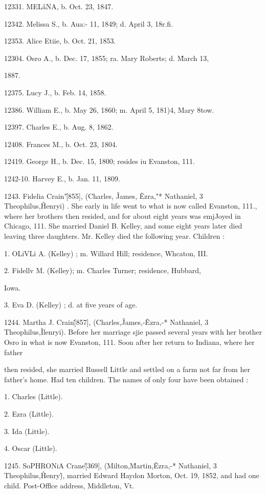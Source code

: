 12331. MEL\^aNA, b. Oct. 23, 1847. 

12342. Melissa S., b. Aua:- 11, 1849; d. April 3, 18r.fi. 

12353. Alice Etiie, b. Oct. 21, 1853. 

12304. Osro A., b. Dec. 17, 1855; ra. Mary Roberts; d. \^March 13, 

1887. 

12375. Lucy J., b. Feb. 14, 1858. 

12386. William E., b. May 26, 1860; m. April 5, 181)4, Mary 8tow. 

12397. Charles E., b. Aug. 8, 1862. 

12408. Frances M., b. Oct. 23, 1804. 

12419. George H., b. Dec. 15, 1800; resides iu Evanston, 111. 

1242-10. Harvey E., b. Jan. 11, 1809. 

1243. Fidelia Crain'\^ [855], (Charles, \^ James, \^ Ezra,"* 
Nathaniel, 3 Theophilus,\^ Henryi) . She early in life went to what 
is now called Evanston, 111., where her brothers then resided, and 
for about eight years was emjJoyed in Chicago, 111. She married 
Daniel B. Kelley, and some eight years later died leaving three 
daughters. Mr. Kelley died the following year. Children : 

1. OLiVLi A. (Kelley) ; m. Willard Hill; residence, Whcaton, III. 

2. Fidellv M. (Kelley); m. Charles Turner; residence, Hubbard, 

Iowa. 

3. Eva D. (Kelley) ; d. at five years of age. 

1244. Martha J. Crain\^ [857], (Charles,\^ James,-\^ Ezra,-* 
Nathaniel, 3 Theophilus,\^ Ilenryi). Before her marriage sjie 
passed several years with her brother Osro in what is now 
Evanston, 111. Soon after her return to Indiana, where her father 




then resided, she married Russell Little and settled on a farm not 
far from her father's home. Had ten children. The names of 
only four have been obtained : 

1. Charles (Little). 

2. Ezra (Little). 

3. Ida (Little). 

4. Oscar (Little). 

1245. SoPHRONiA Crane\^ [369], (Milton,\^ Martin,\^ Ezra,-* 
Nathaniel, 3 Theophilus,\^ Henry\^), married Edward Haydon 
Morton, Oct. 19, 1852, and had one child. Post-Offlce address, 
Middleton, Vt. 

